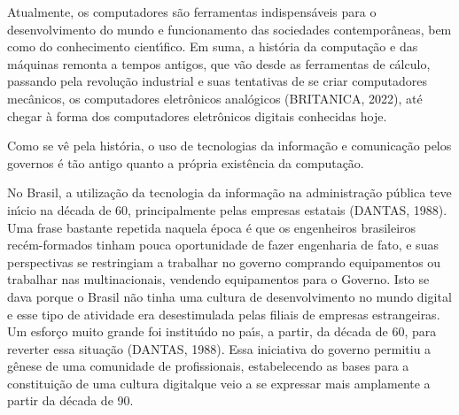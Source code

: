 \documentclass[
12pt,		%
openright,	%
twoside,  %
a4paper,			%
chapter=TITLE,		%
english,			%
french,				%
spanish,			%
brazil				%
]{USPSC-classe/USPSC}
\begin{document}
Atualmente, os computadores s\~ao ferramentas indispens\'aveis para o desenvolvimento do mundo e funcionamento das sociedades contempor\^aneas, bem como do conhecimento cient\'{\i}fico. Em suma, a hist\'oria da computa\c{c}\~ao e das m\'aquinas remonta a tempos antigos, que v\~ao desde as ferramentas de c\'alculo, passando pela revolu\c{c}\~ao industrial e suas tentativas de se criar computadores mec\^anicos, os computadores eletr\^onicos anal\'ogicos  (BRITANICA, 2022), at\'e chegar \`a forma dos computadores eletr\^onicos digitais conhecidas hoje.

















Como se v\^e pela hist\'oria, o uso de tecnologias da informa\c{c}\~ao e comunica\c{c}\~ao pelos governos \'e t\~ao antigo quanto a pr\'opria exist\^encia da computa\c{c}\~ao.

















No Brasil, a utiliza\c{c}\~ao da tecnologia da informa\c{c}\~ao na administra\c{c}\~ao p\'ublica teve in\'{\i}cio na d\'ecada de 60, principalmente pelas empresas estatais (DANTAS, 1988). Uma frase bastante repetida naquela \'epoca \'e que os engenheiros brasileiros rec\'em-formados tinham pouca oportunidade de fazer engenharia de fato, e suas perspectivas se restringiam a trabalhar no governo comprando equipamentos ou trabalhar nas multinacionais, vendendo equipamentos para o Governo. Isto se dava porque o Brasil n\~ao tinha uma cultura de desenvolvimento no mundo digital e esse tipo de atividade era desestimulada pelas filiais de empresas estrangeiras. Um esfor\c{c}o muito grande foi institu\'{\i}do no pa\'{\i}s, a partir, da d\'ecada de 60, para reverter essa situa\c{c}\~ao (DANTAS, 1988). Essa iniciativa do governo permitiu a g\^enese de uma comunidade de profissionais, estabelecendo as bases para a constitui\c{c}\~ao de uma \textquotedbl  cultura digital\textquotedbl  que veio a se expressar mais amplamente a partir da d\'ecada de 90.
\end{document}
